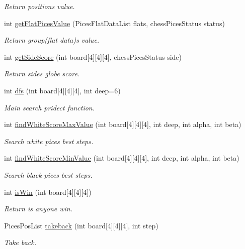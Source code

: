 \begin{DoxyCompactItemize}
\begin{DoxyCompactList}\small\item\em Return position\textquotesingle{}s value. \end{DoxyCompactList}\item 
int \hyperlink{class_chess_board_a45115518c4f03974c31eb944ac6fa521}{get\+Flat\+Pices\+Value} (Pices\+Flat\+Data\+List flats, chess\+Pices\+Status status)
\begin{DoxyCompactList}\small\item\em Return group(flat data)\textquotesingle{}s value. \end{DoxyCompactList}\item 
int \hyperlink{class_chess_board_aae32c08142508998bedeb0907f35e62f}{get\+Side\+Score} (int board\mbox{[}4\mbox{]}\mbox{[}4\mbox{]}\mbox{[}4\mbox{]}, chess\+Pices\+Status side)
\begin{DoxyCompactList}\small\item\em Return side\textquotesingle{}s globe score. \end{DoxyCompactList}\item 
int \hyperlink{class_chess_board_a3195308e0aecff2ad8b044b7118a5a4c}{dfs} (int board\mbox{[}4\mbox{]}\mbox{[}4\mbox{]}\mbox{[}4\mbox{]}, int deep=6)
\begin{DoxyCompactList}\small\item\em Main search pridect function. \end{DoxyCompactList}\item 
int \hyperlink{class_chess_board_af1577bee7c63bad019fdda023041ad96}{find\+White\+Score\+Max\+Value} (int board\mbox{[}4\mbox{]}\mbox{[}4\mbox{]}\mbox{[}4\mbox{]}, int deep, int alpha, int beta)
\begin{DoxyCompactList}\small\item\em Search white pices\textquotesingle{} best steps. \end{DoxyCompactList}\item 
int \hyperlink{class_chess_board_ac23dc6b8a273c3e1fafb78d98e5e67d0}{find\+White\+Score\+Min\+Value} (int board\mbox{[}4\mbox{]}\mbox{[}4\mbox{]}\mbox{[}4\mbox{]}, int deep, int alpha, int beta)
\begin{DoxyCompactList}\small\item\em Search black pices\textquotesingle{} best steps. \end{DoxyCompactList}\item 
int \hyperlink{class_chess_board_abf92d3ef0baf837f8a15b8746d4e44cc}{is\+Win} (int board\mbox{[}4\mbox{]}\mbox{[}4\mbox{]}\mbox{[}4\mbox{]})
\begin{DoxyCompactList}\small\item\em Return is anyone win. \end{DoxyCompactList}\item 
Pices\+Pos\+List \hyperlink{class_chess_board_ae623e32e472e4bb21198707b9b22213f}{takeback} (int board\mbox{[}4\mbox{]}\mbox{[}4\mbox{]}\mbox{[}4\mbox{]}, int step)
\begin{DoxyCompactList}\small\item\em Take back. \end{DoxyCompactList}\end{DoxyCompactItemize}
